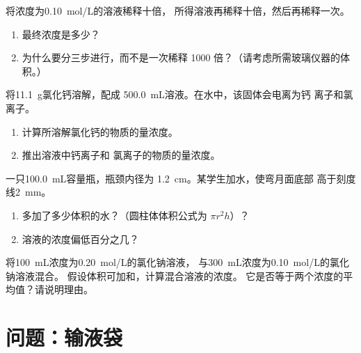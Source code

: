 \begin{exercise}[$\star\star\star$]\label{exo:g10:concentration-and-dilution:12}
将浓度为\qty{0.10}{mol/L}的溶液稀释十倍，
所得溶液再稀释十倍，然后再稀释一次。
\begin{enumerate}
  \item 最终浓度是多少？
  \item 为什么要分三步进行，而不是一次稀释
        1000 倍？（请考虑所需玻璃仪器的体积。）
\end{enumerate}
\end{exercise}

\begin{exercise}[$\star\star\star$]\label{exo:g10:concentration-and-dilution:13}
将\qty{11.1}{g}氯化钙溶解，配成
\qty{500.0}{mL}溶液。在水中，该固体会电离为钙
离子和氯离子。
\begin{enumerate}
  \item 计算所溶解氯化钙的物质的量浓度。
  \item 推出溶液中钙离子和
        氯离子的物质的量浓度。
\end{enumerate}
\end{exercise}

\begin{exercise}[$\star\star\star$]\label{exo:g10:concentration-and-dilution:14}
一只\qty{100.0}{mL}容量瓶，瓶颈内径为
\qty{1.2}{cm}。某学生加水，使弯月面底部
高于刻度线\qty{2}{mm}。
\begin{enumerate}
  \item 多加了多少体积的水？（圆柱体体积公式为
        $\pi r^2 h$）？
  \item 溶液的浓度偏低百分之几？
\end{enumerate}
\end{exercise}

\begin{exercise}[$\star\star\star$]\label{exo:g10:concentration-and-dilution:15}
将\qty{100}{mL}浓度为\qty{0.20}{mol/L}的氯化钠溶液，
与\qty{300}{mL}浓度为\qty{0.10}{mol/L}的氯化钠溶液混合。
假设体积可加和，计算混合溶液的浓度。
它是否等于两个浓度的平均值？请说明理由。
\end{exercise}

\section{问题：输液袋}

